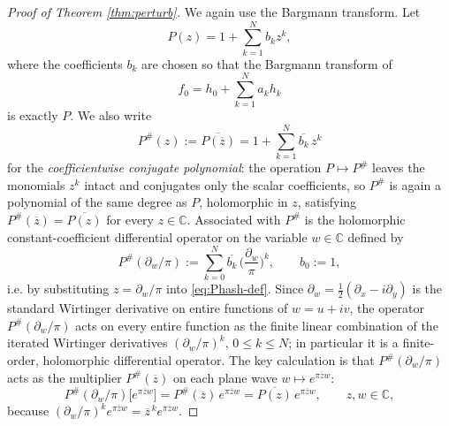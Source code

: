 \documentclass[a4paper,11pt,reqno]{amsart}
\numberwithin{equation}{section}
\theoremstyle{plain} %
\theoremstyle{definition} %
\theoremstyle{remark}
\newcommand{\C}{\mathbb{C}}
\begin{document}
\begin{proof}[Proof of Theorem \ref{thm:perturb}]
We again use the Bargmann transform. Let
\[
P(z)=1+\sum_{k=1}^N b_k z^k,
\]
where the coefficients $b_k$ are chosen so that the Bargmann transform of
\[
f_0=h_0+\sum_{k=1}^N a_k h_k
\]
is exactly $P$. We also write
\begin{equation}\label{eq:Phash-def}
P^\#(z):=\overline{P(\overline z)}
=1+\sum_{k=1}^N \overline{b_k}\,z^k
\end{equation}
for the \emph{coefficientwise conjugate polynomial}: the operation
\(P\mapsto P^\#\) leaves the monomials \(z^k\) intact and conjugates only the
scalar coefficients, so \(P^\#\) is again a polynomial of the same degree as
\(P\), holomorphic in \(z\), satisfying
\(P^\#(\overline z)=\overline{P(z)}\) for every \(z\in\C\).
Associated with \(P^\#\) is the holomorphic constant-coefficient differential
operator on the variable \(w\in\C\) defined by
\begin{equation}\label{eq:Phash-operator}
P^\#(\partial_w/\pi)
:=
\sum_{k=0}^N\overline{b_k}\,\Big(\frac{\partial_w}{\pi}\Big)^k,
\qquad b_0:=1,
\end{equation}
i.e. by substituting \(z=\partial_w/\pi\) into \eqref{eq:Phash-def}. Since
\(\partial_w=\frac12(\partial_x-i\partial_y)\) is the standard Wirtinger
derivative on entire functions of \(w=u+iv\), the operator
\(P^\#(\partial_w/\pi)\) acts on every entire function as the finite linear
combination of the iterated Wirtinger derivatives \((\partial_w/\pi)^k\),
\(0\le k\le N\); in particular it is a finite-order, holomorphic differential
operator. The key calculation is that
\(P^\#(\partial_w/\pi)\) acts as the multiplier \(P^\#(\overline z)\) on
each plane wave \(w\mapsto e^{\pi\overline z w}\):
\begin{equation}\label{eq:Phash-on-planewaves}
P^\#(\partial_w/\pi)\big[e^{\pi\overline z w}\big]
=
P^\#(\overline z)\,e^{\pi\overline z w}
=
\overline{P(z)}\,e^{\pi\overline z w},
\qquad z,w\in\C,
\end{equation}
because \((\partial_w/\pi)^k e^{\pi\overline z w}=\overline z^{\,k}e^{\pi\overline z w}\).


\end{proof}
\end{document}

